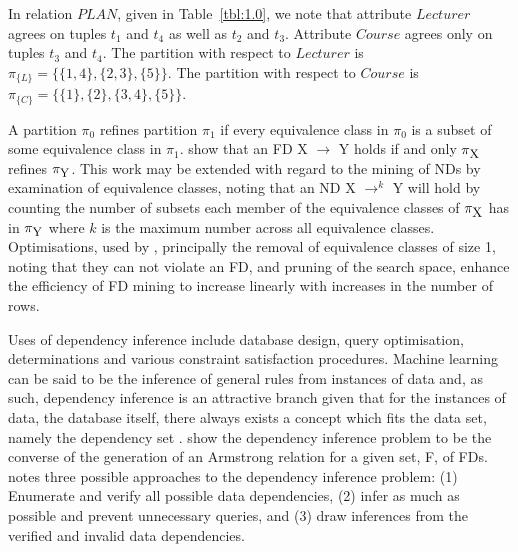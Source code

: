 \begin{example}
\begin{rm} 
In relation $PLAN$, given in Table~\ref{tbl:1.0}, we note that
attribute $Lecturer$ agrees on tuples $t_1$ and $t_4$ as well as $t_2$
and $t_3$. Attribute $Course$ agrees only on tuples $t_3$ and
$t_4$. The partition with respect to $Lecturer$ is $\pi_{\{L\}} =
\{\{1,4\},\{2,3\},\{5\}\}$. The partition with respect to $Course$ is
$\pi_{\{C\}} = 
\{\{1\},\{2\},\{3,4\},\{5\}\}$. 
\end{rm}
\end{example}

A partition $\pi_0$ refines partition $\pi_1$ if every equivalence
class in $\pi_0$ is a subset of some equivalence class in
$\pi_1$. \cite{hkp98} show that an FD X $\to$ Y holds if and only
$\pi_{\mbox{\small{X}}}$ refines $\pi_{\mbox{\small{Y}}}$.  This work
may be extended with regard to the mining of NDs by examination of
equivalence classes, noting that an ND X $\to^k$ Y will hold by
counting the number of subsets each member of the equivalence classes
of $\pi_{\mbox{\small{X}}}$ has in $\pi_{\mbox{\small{Y}}}$ where $k$
is the maximum number across all 
equivalence classes. Optimisations, used by
\cite{hkp98}, principally the removal of equivalence classes of size 1,
noting that 
they can not violate an FD, and pruning of the search space, enhance
the efficiency of FD mining to increase linearly with increases in the
number of rows.
\medskip

Uses of dependency inference include database design, query optimisation,
determinations and various constraint satisfaction procedures.
 Machine
learning can be said to be the inference of general rules from
instances of data and, as such, dependency inference is an attractive
branch given that for the instances of data, the database itself,
there always exists a concept which fits the data set, namely the
dependency set \cite{mr94}. 
\cite{mr86} show the dependency inference problem to be the converse of
the generation of an Armstrong relation for a given set, F, of
FDs. \cite{bb95} notes three possible approaches
to the dependency 
inference problem: (1) Enumerate and verify all possible data
dependencies, (2) infer as much as possible and prevent unnecessary
queries, and (3) draw inferences from the verified and invalid data
dependencies.



